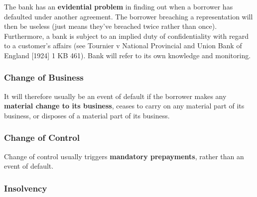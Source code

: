 \documentclass[
]{article}
\begin{document}
The bank has an \textbf{evidential problem} in finding out when a
borrower has defaulted under another agreement. The borrower breaching a
representation will then be useless (just means they've breached twice
rather than once). Furthermore, a bank is subject to an implied duty of
confidentiality with regard to a customer's affairs (see Tournier v
National Provincial and Union Bank of England {[}1924{]} 1 KB 461). Bank
will refer to its own knowledge and monitoring.

\hypertarget{change-of-business}{%
\subsubsection{Change of Business}\label{change-of-business}}

It will therefore usually be an event of default if the borrower makes
any \textbf{material change to its business}, ceases to carry on any
material part of its business, or disposes of a material part of its
business.

\hypertarget{change-of-control}{%
\subsubsection{Change of Control}\label{change-of-control}}

Change of control usually triggers \textbf{mandatory prepayments},
rather than an event of default.

\hypertarget{insolvency}{%
\subsubsection{Insolvency}\label{insolvency}}
\end{document}

